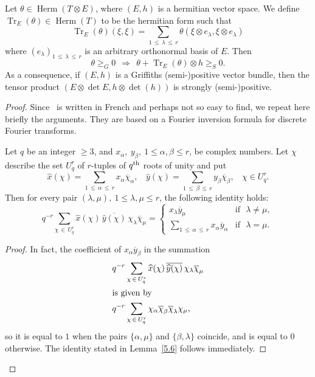 \documentclass[AHL,Unicode,longabstracts,published]{cedram}
\DeclareMathOperator{\Herm}{Herm}
\DeclareMathOperator{\Tr}{Tr}
\let\leq\leqslant
\let\geq\geqslant
\begin{document}
\begin{prop}
Let $\theta\in\Herm(T\otimes E)$, where
$(E,h)$ is a hermitian vector space. We define $\Tr_E(\theta)\in\Herm(T)$ to be the hermitian form such that
\[
\Tr_E(\theta)(\xi,\xi)=\sum_{1\,\leq\,\lambda\,\leq\,r}
\theta(\xi\otimes e_\lambda,\xi\otimes e_\lambda)
\]
where $(e_\lambda)_{1\,\leq\,\lambda\,\leq\,r}$ is an arbitrary orthonormal basis of $E$. Then
\[
\theta\geq_G 0~~\Longrightarrow~~
\theta+\Tr_E(\theta)\otimes h\geq_S 0.
\]
As a consequence, if $(E,h)$ is a Griffiths (semi-)positive vector bundle, then the tensor product
$(E\otimes \det E,h\otimes\det(h))$ is strongly (semi-)positive.
\end{prop}
\begin{proof}
Since~\cite{Dem80} is written in French and perhaps not so easy to find, we repeat here briefly the arguments. They are based on a Fourier inversion formula for discrete Fourier transforms.
\begin{lemm}\label{5.6}
Let $q$ be an integer $\geq 3$, and
$x_\alpha,~y_\beta,~1\leq\alpha,\beta\leq r$, be complex numbers. Let $\chi$ describe the set $U^r_q$ of $r$-tuples of $q^{\rm th}$ roots of unity and put
\[
\widehat x(\chi) = \sum_{1\,\leq\,\alpha\,\leq\,r} x_\alpha\overline \chi_\alpha,~~~~
\widehat y(\chi) = \sum_{1\,\leq\,\beta\,\leq\,r} y_\beta\overline\chi_\beta,~~~~\chi\in U^r_q.
\]
Then for every pair $(\lambda,\mu),~1\leq\lambda,\mu\leq r$, the following identity holds:
\[
q^{-r} \sum_{\chi\,\in\,U^r_q}
\widehat x(\chi)\,\overline{\widehat y(\chi)}\,\chi_\lambda\overline \chi_\mu =
\begin{cases}
x_\lambda\overline y_\mu &\text{if~~}\lambda\ne\mu,\\
\sum\limits_{1\,\leq\,\alpha\,\leq\,r} x_\alpha\overline y_\alpha &\text{if~~}\lambda=\mu.
\end{cases}
\]
\end{lemm}


\begin{proof}
In fact, the coefficient of $x_\alpha\overline y_\beta$ in the summation
\begin{align*}
&q^{-r} \sum_{\chi\,\in\,U^r_q}\widehat x(\chi)\,\overline{\widehat y(\chi)}\, \chi_\lambda\overline \chi_\mu
\\
\intertext{is given by}
&q^{-r} \sum_{\chi\,\in\,U^r_q}\chi_\alpha \overline \chi_\beta\overline
\chi_\lambda \chi_\mu,
\end{align*}
so it is equal to $1$ when the pairs $\{ \alpha,\mu\}$ and
$\{\beta,\lambda\}$ coincide, and is equal to $0$ otherwise. The identity stated in Lemma~\ref{5.6} follows immediately.
\end{proof}


\end{proof}
\end{document}
